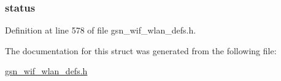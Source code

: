 \hypertarget{a00311_ac4f6d5d1544a8d2c1309479ffe1b61ab}{
\subsubsection[{status}]{ {\bf status}}}
\label{a00311_ac4f6d5d1544a8d2c1309479ffe1b61ab}


Definition at line 578 of file gsn\_\-wif\_\-wlan\_\-defs.h.



The documentation for this struct was generated from the following file:\begin{DoxyCompactItemize}
\item 
\hyperlink{a00613}{gsn\_\-wif\_\-wlan\_\-defs.h}\end{DoxyCompactItemize}
